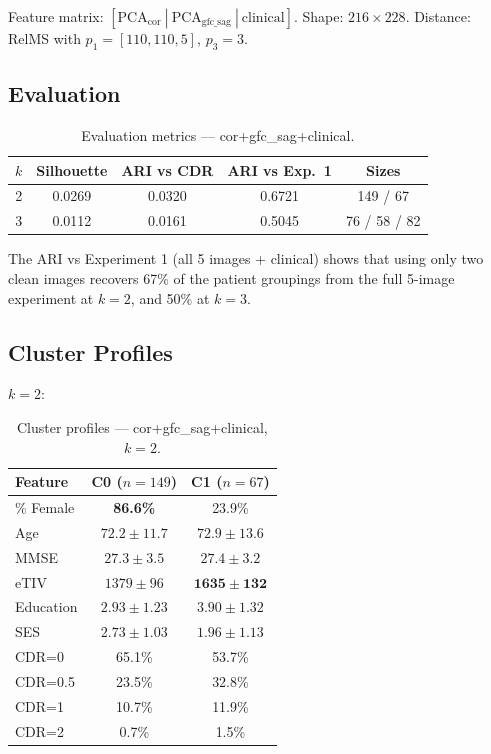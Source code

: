 \documentclass[12pt, a4paper]{article}
\begin{document}
Feature matrix: $[\text{PCA}_\text{cor}\ |\ \text{PCA}_\text{gfc\_sag}\ |\ \text{clinical}]$.
Shape: $216 \times 228$. Distance: RelMS with $p_1 = [110, 110, 5]$, $p_3 = 3$.

\subsection{Evaluation}

\begin{table}[H]
\centering
\caption{Evaluation metrics — cor+gfc\_sag+clinical.}
\begin{tabular}{ccccc}
\toprule
$k$ & \textbf{Silhouette} & \textbf{ARI vs CDR} & \textbf{ARI vs Exp.\ 1} & Sizes \\
\midrule
2 & 0.0269 & 0.0320 & 0.6721 & 149 / 67 \\
3 & 0.0112 & 0.0161 & 0.5045 & 76 / 58 / 82 \\
\bottomrule
\end{tabular}
\end{table}

The ARI vs Experiment 1 (all 5 images + clinical) shows that using only two clean images
recovers 67\% of the patient groupings from the full 5-image experiment at $k=2$,
and 50\% at $k=3$.

\subsection{Cluster Profiles}

\textbf{$k=2$}:

\begin{table}[H]
\centering
\caption{Cluster profiles — cor+gfc\_sag+clinical, $k=2$.}
\begin{tabular}{lcc}
\toprule
\textbf{Feature} & \textbf{C0 ($n=149$)} & \textbf{C1 ($n=67$)} \\
\midrule
\% Female & \textbf{86.6\%} & 23.9\% \\
Age & $72.2 \pm 11.7$ & $72.9 \pm 13.6$ \\
MMSE & $27.3 \pm 3.5$ & $27.4 \pm 3.2$ \\
eTIV & $1379 \pm 96$ & $\mathbf{1635 \pm 132}$ \\
Education & $2.93 \pm 1.23$ & $3.90 \pm 1.32$ \\
SES & $2.73 \pm 1.03$ & $1.96 \pm 1.13$ \\
\midrule
CDR=0 & 65.1\% & 53.7\% \\
CDR=0.5 & 23.5\% & 32.8\% \\
CDR=1 & 10.7\% & 11.9\% \\
CDR=2 & 0.7\% & 1.5\% \\
\bottomrule
\end{tabular}
\end{table}
\end{document}
